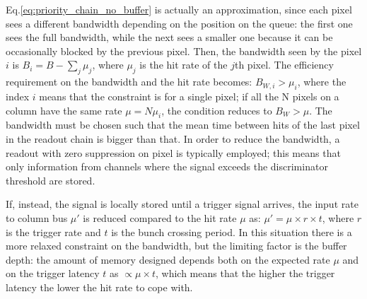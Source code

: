    Eq.\ref{eq:priority_chain_no_buffer} is actually an approximation, since each pixel sees a different bandwidth depending on the position on the queue: the first one sees the full bandwidth, while the next sees a smaller one because it can be occasionally blocked by the previous pixel. Then, the bandwidth seen by the pixel $i$ is $B_{i} = B - \sum _{j}\mu_{j}$, where $\mu_j$ is the hit rate of the $j$th pixel.
   The efficiency requirement on the bandwidth and the hit rate becomes: $B_{W,i} > \mu_{i}$, where the index $i$ means that the constraint is for a single pixel; if all the N pixels on a column have the same rate $\mu = N\mu_{i}$, the condition reduces to $B_{W} > \mu$.
   The bandwidth must be chosen such that the mean time between hits of the last pixel in the readout chain is bigger than that.
   In order to reduce the bandwidth, a readout with zero suppression on pixel is typically employed; this means that only information from channels where the signal exceeds the discriminator threshold are stored. 

   If, instead, the signal is locally stored until a trigger signal arrives, the input rate to column bus $\mu '$ is reduced compared to the hit rate $\mu$ as: $\mu'=\mu \times r \times t$, where $r$ is the trigger rate and $t$ is the bunch crossing period.
   In this situation there is a more relaxed constraint on the bandwidth, but the limiting factor is the buffer depth: the amount of memory designed depends both on the expected rate $\mu$ and on the trigger latency $t$ as $\propto\mu \times t$, which means that the higher the trigger latency the lower the hit rate to cope with. 

